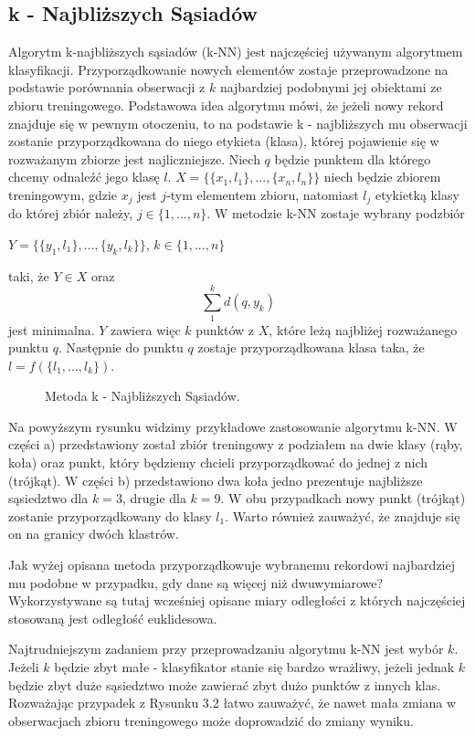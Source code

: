 \documentclass[12pt,a4paper]{report}
\begin{document}
\subsection{k - Najbliższych Sąsiadów}%
Algorytm k-najbliższych sąsiadów (k-NN) jest najczęściej używanym algorytmem klasyfikacji. 
Przyporządkowanie nowych elementów zostaje przeprowadzone na podstawie porównania obserwacji z $k$ najbardziej podobnymi jej obiektami ze zbioru treningowego. Podstawowa idea algorytmu mówi, że jeżeli nowy rekord znajduje się w pewnym otoczeniu, to na podstawie k - najbliższych mu obserwacji zostanie przyporządkowana do niego etykieta (klasa), której pojawienie się w rozważanym zbiorze jest najliczniejsze.
Niech $q$ będzie punktem dla którego chcemy odnaleźć jego klasę $l$. 
$X=\{\{x_1,l_1\},...,\{x_n,l_n\}\}$ niech będzie zbiorem treningowym, gdzie $x_j$ jest $j$-tym elementem zbioru, natomiast $l_j$ etykietką klasy do której zbiór należy, $j\in\{1,...,n\}$.
W metodzie k-NN zostaje wybrany podzbiór 
\begin{center}
$Y=\{\{y_1,l_1\},...,\{y_k,l_k\}\}$, $k\in\{1,...,n\}$
\end{center}
taki, że $Y \in X$ oraz $$\sum_1^k d(q,y_k)$$ jest minimalna. $Y$ zawiera więc $k$ punktów z $X$, które leżą najbliżej rozważanego punktu $q$. Następnie do punktu $q$ zostaje przyporządkowana klasa taka, że $l=f(\{l_1,...,l_k\})$.
\begin{center}
\begin{figure}[H]
\centering
\caption{Metoda k - Najbliższych Sąsiadów.}
\end{figure}
\end{center}
Na powyższym rysunku widzimy przykładowe zastosowanie algorytmu k-NN. W części a) przedstawiony został zbiór treningowy z podziałem na dwie klasy (rąby, koła) oraz punkt, który będziemy chcieli przyporządkować do jednej z nich (trójkąt). W części b) przedstawiono dwa koła jedno prezentuje najbliższe sąsiedztwo dla $k = 3$, drugie dla $k = 9$. W obu przypadkach nowy punkt (trójkąt) zostanie przyporządkowany do klasy $l_1$. Warto również zauważyć, że znajduje się on na granicy dwóch klastrów.

Jak wyżej opisana metoda przyporządkowuje wybranemu rekordowi najbardziej mu podobne w przypadku, gdy dane są więcej niż dwuwymiarowe?
Wykorzystywane są tutaj wcześniej opisane miary odległości z których najczęściej stosowaną jest odległość euklidesowa.

Najtrudniejszym zadaniem przy przeprowadzaniu algorytmu k-NN jest wybór $k$. Jeżeli $k$ będzie zbyt małe - klasyfikator stanie się bardzo wrażliwy, jeżeli jednak $k$ będzie zbyt duże sąsiedztwo może zawierać zbyt dużo punktów z innych klas. Rozważając przypadek z Rysunku 3.2 łatwo zauważyć, że nawet mała zmiana w obserwacjach zbioru treningowego może doprowadzić do zmiany wyniku.
\end{document}
